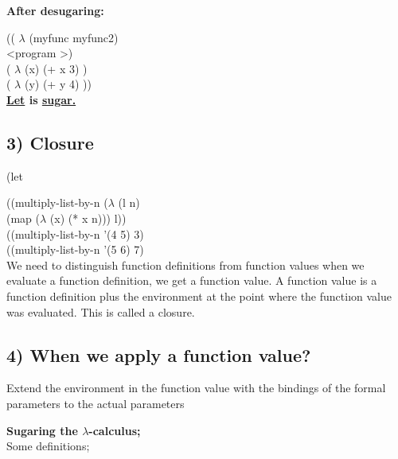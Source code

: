 \documentclass{article}
\begin{document}
\begin{flushleft}
\vspace{5mm}

\textbf{After desugaring:}
\vspace{2mm}

((  $\lambda$ (myfunc myfunc2)\\
\textless program \textgreater)\\
\hspace{1cm}( $\lambda$ (x) (+ x 3) )\\
\hspace{1cm}( $\lambda$ (y) (+ y 4) ))\\

\textbf{\underline {Let} is \underline{sugar.}}





\subsection*{3) Closure }
(let
   
  \hspace{1cm}((multiply-list-by-n ($\lambda$  (l n)\\
  \hspace{1cm} (map ($\lambda$ (x) (* x n))) l))\\

  \hspace{1cm}((multiply-list-by-n '(4 5) 3)\\
  \hspace{1cm}((multiply-list-by-n '(5 6) 7)\\
  
 \vspace{5mm}
 We need to distinguish function definitions from function values when we evaluate a function definition, we get a function value. A function value is a function definition plus the environment at the point where the functiıon value was evaluated. This is called a closure.


\subsection*{4) When we apply a function value?}

Extend the environment in the function value with the bindings of the formal parameters to the actual parameters

\vspace{2mm}
\textbf{Sugaring the $\lambda$-calculus; }\\
\vspace{2mm}
Some definitions;


\end{flushleft}
\end{document}
